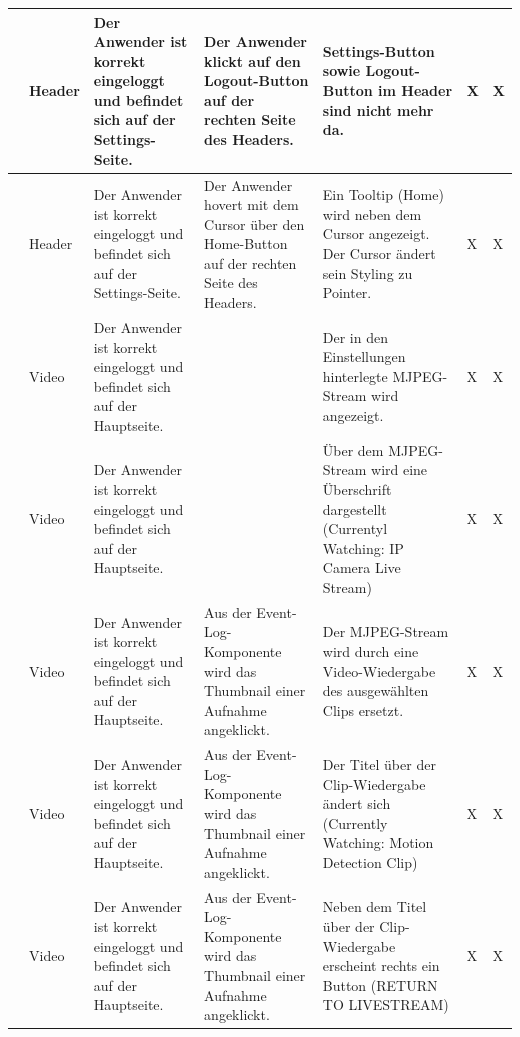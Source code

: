 \begin{longtable}{| p{} | p{} | p{} | p{} | p{} | p{} | p{} |}
	\stepcounter{TestNumber}\arabic{TestNumber} & Header & Der Anwender ist korrekt eingeloggt und befindet sich auf der Settings-Seite. & Der Anwender klickt auf den Logout-Button auf der rechten Seite des Headers. & Settings-Button sowie Logout-Button im Header sind nicht mehr da. & X & X \\ \hline
	
	\stepcounter{TestNumber}\arabic{TestNumber} & Header & Der Anwender ist korrekt eingeloggt und befindet sich auf der Settings-Seite. & Der Anwender hovert mit dem Cursor über den Home-Button auf der rechten Seite des Headers. & Ein Tooltip (Home) wird neben dem Cursor angezeigt. Der Cursor ändert sein Styling zu Pointer. & X & X \\ \hline

	\stepcounter{TestNumber}\arabic{TestNumber} & Video & Der Anwender ist korrekt eingeloggt und befindet sich auf der Hauptseite. & & Der in den Einstellungen hinterlegte MJPEG-Stream wird angezeigt. & X & X \\ \hline	
	
	\stepcounter{TestNumber}\arabic{TestNumber} & Video & Der Anwender ist korrekt eingeloggt und befindet sich auf der Hauptseite. & & Über dem MJPEG-Stream wird eine Überschrift dargestellt (Currentyl Watching: IP Camera Live Stream) & X & X \\ \hline	
	
	\stepcounter{TestNumber}\arabic{TestNumber} & Video & Der Anwender ist korrekt eingeloggt und befindet sich auf der Hauptseite. & Aus der Event-Log-Komponente wird das Thumbnail einer Aufnahme angeklickt. & Der MJPEG-Stream wird durch eine Video-Wiedergabe des ausgewählten Clips ersetzt. & X & X \\ \hline
	
	\stepcounter{TestNumber}\arabic{TestNumber} & Video & Der Anwender ist korrekt eingeloggt und befindet sich auf der Hauptseite. & Aus der Event-Log-Komponente wird das Thumbnail einer Aufnahme angeklickt. & Der Titel über der Clip-Wiedergabe ändert sich (Currently Watching: Motion Detection Clip) & X & X \\ \hline
	
	\stepcounter{TestNumber}\arabic{TestNumber} & Video & Der Anwender ist korrekt eingeloggt und befindet sich auf der Hauptseite. & Aus der Event-Log-Komponente wird das Thumbnail einer Aufnahme angeklickt. & Neben dem Titel über der Clip-Wiedergabe erscheint rechts ein Button (RETURN TO LIVESTREAM) & X & X \\ \hline
	

\end{longtable}
